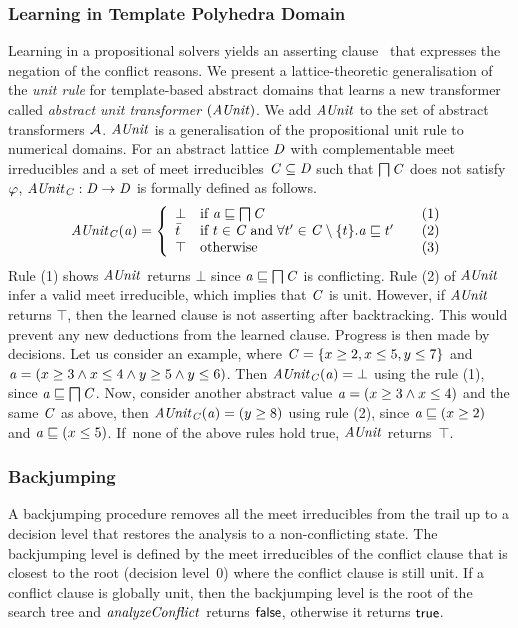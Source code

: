 \subsubsection{Learning in Template Polyhedra Domain}
%
Learning in a propositional solvers yields an asserting
clause~\cite{cdcl} that expresses the negation of the conflict
reasons.  We present a lattice-theoretic generalisation of the 
{\em unit rule} for template-based abstract domains that learns a new 
transformer called {\em abstract unit transformer} $(\mathit{AUnit})$.    
We add $\mathit{AUnit}$ to the set of abstract transformers $\mathcal{A}$. 
$\mathit{AUnit}$ is a generalisation of the propositional unit rule to
numerical domains.  For an abstract lattice $\mathit{D}$ with
complementable meet irreducibles and a set of meet irreducibles $\mathit{C}
\subseteq \mathit{D}$ such that $\bigsqcap
\mathit{C}$ does not satisfy $\varphi$, $\mathit{AUnit}_{\mathit{C}}: \mathit{D} \rightarrow
\mathit{D}$ is formally defined as follows.
\[ \aunit_\conflictset(\absval) =
 \left\{\begin{array}{l@{\quad}l@{\qquad}l}
  \bot       & \text{if } \absval \sqsubseteq \bigsqcap \conflictset & (1)\\
  \bar{t}    & \text{if } t \in \conflictset \; \text{and} \; \forall t' \in \conflictset
  \setminus \{t\}. \absval  \sqsubseteq t' & (2) \\
  \top & \text{otherwise} & (3) \\
 \end{array}\right.
\]
Rule (1) shows $\mathit{AUnit}$ returns $\bot$ since 
$\mathit{a} \sqsubseteq \bigsqcap \mathit{C}$ is conflicting.  
Rule (2) of $\mathit{AUnit}$ infer a valid meet irreducible, 
which implies that $\mathit{C}$ is unit.  However, if 
$\mathit{AUnit}$ returns $\top$, then the learned clause is not 
asserting after backtracking.  This would prevent any new 
deductions from the learned clause. Progress is then made by decisions.
%
Let us consider an example, where $\mathit{C} = \{x \geq 2, x \leq 5, y
\leq 7 \}$ and $\mathit{a} = (x \geq 3\wedge\allowbreak x \leq
4\wedge\allowbreak y \geq 5\wedge y \leq 6)$.  Then
$\mathit{AUnit}_{\mathit{C}}(\mathit{a}) = \bot$ using the rule (1), since $\mathit{a}
\sqsubseteq \bigsqcap\mathit{C}$.  Now, consider another abstract value
$\mathit{a} = (x \geq 3\wedge x \leq 4)$ and the same $\mathit{C}$ as above,
then $\mathit{AUnit}_{\mathit{C}}(\mathit{a}) = (y \geq 8)$ using rule (2), since
$\mathit{a} \sqsubseteq (x \geq 2)$ and $\mathit{a} \sqsubseteq (x \leq 5)$.  
If~none of the above rules hold true, $\mathit{AUnit}$ returns~$\top$.
%
\subsubsection{Backjumping}
A backjumping procedure removes all the meet irreducibles from 
the trail up to a decision level that restores the analysis to a
non-conflicting state.  The backjumping level is defined by the
meet irreducibles of the conflict clause that is closest 
to the root (decision level~0) where the conflict
clause is still unit.  If a conflict clause is globally unit, then the
backjumping level is the root of the search tree and
$\mathit{analyzeConflict}$ returns $\mathsf{false}$, otherwise it returns $\mathsf{true}$.
